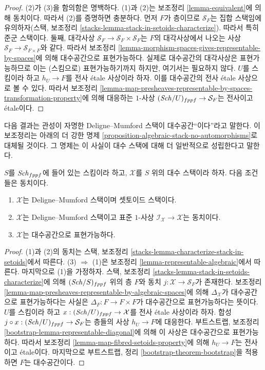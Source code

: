 \begin{proof}
(2)가 (3)을 함의함은 명백하다. (1)과 (2)는 보조정리
\ref{lemma-equivalent}에 의해 동치이다. 따라서 (2)를 증명하면 충분하다.
먼저 $F$가 층이므로 $\mathcal{S}_F$는 집합 스택임에 유의하자(스택,
보조정리 \ref{stacks-lemma-stack-in-setoids-characterize}). 따라서 특히
준군 스택이다. 둘째, 대각사상
$\mathcal{S}_F \to \mathcal{S}_F  \times \mathcal{S}_F$는 $F$의
대각사상에서 나오는 사상
$\mathcal{S}_F \to \mathcal{S}_{F \times F}$와 같다. 따라서 보조정리
\ref{lemma-morphism-spaces-gives-representable-by-spaces}에 의해
대수공간으로 표현가능하다. 실제로 대수공간의 대각사상은 표현가능하므로
이는 (스킴으로) 표현가능하기까지 하지만, 여기서는 필요하지 않다.
$U$를 스킴이라 하고 $h_U \to F$를 전사 \'etale 사상이라 하자. 이를
대수공간의 전사 \'etale 사상으로 볼 수 있다. 따라서 보조정리
\ref{lemma-map-presheaves-representable-by-spaces-transformation-property}에
의해 대응하는 $1$-사상 $(\mathit{Sch}/U)_{fppf} \to \mathcal{S}_F$는 전사이고
\'etale이다.
\end{proof}

\noindent
다음 결과는 관성이 자명한 Deligne--Mumford 스택이 대수공간``이다''라고
말한다. 이 보조정리는 아래의 더 강한 명제
\ref{proposition-algebraic-stack-no-automorphisms}로 대체될 것이다. 그
명제는 이 사실이 대수 스택에 대해 더 일반적으로 성립한다고 말한다.

\begin{lemma}
\label{lemma-algebraic-stack-no-automorphisms}
$S$를 $\mathit{Sch}_{fppf}$에 들어 있는 스킴이라 하고, $\mathcal{X}$를
$S$ 위의 대수 스택이라 하자. 다음 조건들은 동치이다.
\begin{enumerate}
\item $\mathcal{X}$는 Deligne--Mumford 스택이며 셋토이드 스택이다.
\item $\mathcal{X}$는 Deligne--Mumford 스택이고 표준 $1$-사상
$\mathcal{I}_\mathcal{X} \to \mathcal{X}$는 동치이다.
\item $\mathcal{X}$는 대수공간으로 표현가능하다.
\end{enumerate}
\end{lemma}

\begin{proof}
(1)과 (2)의 동치는 스택, 보조정리
\ref{stacks-lemma-characterize-stack-in-setoids}에서 따른다.
(3) $\Rightarrow$ (1)은 보조정리 \ref{lemma-representable-algebraic}에서
따른다. 마지막으로 (1)을 가정하자. 스택, 보조정리
\ref{stacks-lemma-stack-in-setoids-characterize}에 의해
$(\mathit{Sch}/S)_{fppf}$ 위의 층 $F$와 동치
$j : \mathcal{X} \to \mathcal{S}_F$가 존재한다. 보조정리
\ref{lemma-map-presheaves-representable-by-algebraic-spaces}에 의해
$\Delta_\mathcal{X}$가 대수공간으로 표현가능하다는 사실은
$\Delta_F : F \to F \times F$가 대수공간으로 표현가능하다는 뜻이다.
$U$를 스킴이라 하고 $x : (\mathit{Sch}/U)_{fppf} \to \mathcal{X}$를 전사
\'etale 사상이라 하자. 합성
$j \circ x : (\mathit{Sch}/U)_{fppf} \to \mathcal{S}_F$는 층들의 사상
$h_U \to F$에 대응한다. 부트스트랩, 보조정리
\ref{bootstrap-lemma-representable-diagonal}에 의해 이 사상은
대수공간으로 표현가능하다. 따라서 보조정리
\ref{lemma-map-fibred-setoids-property}에 의해 $h_U \to F$는 전사이고
\'etale이다. 마지막으로 부트스트랩, 정리
\ref{bootstrap-theorem-bootstrap}을 적용하면 $F$는 대수공간이다.
\end{proof}


